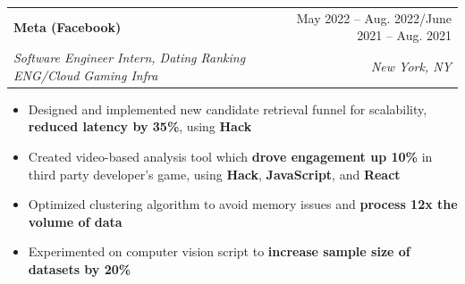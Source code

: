 \documentclass[letterpaper,11pt]{article}
\makeatletter
\newcommand{\resumeItem}[1]{
  \item\small{
    {#1 \vspace{-2pt}}
  }
}
\newcommand{\resumeSubheading}[4]{
  \vspace{-2pt}\item
    \begin{tabular*}{0.97\textwidth}[t]{l@{\extracolsep{\fill}}r}
      \textbf{#1} & #2 \\
      \textit{\small#3} & \textit{\small #4} \\
    \end{tabular*}\vspace{-7pt}
}
\newcommand{\resumeItemListStart}{\begin{itemize}[itemsep=0pt]}
\newcommand{\resumeItemListEnd}{\end{itemize}\vspace{-5pt}}
\makeatother
\begin{document}
    \resumeSubheading
      {Meta (Facebook)}{May 2022 -- Aug. 2022/June 2021 -- Aug. 2021}
      {Software Engineer Intern, Dating Ranking ENG/Cloud Gaming Infra}{New York, NY}
      \resumeItemListStart
        \resumeItem{Designed and implemented new candidate retrieval funnel for scalability, \textbf{reduced latency by 35\%}, using \textbf{Hack}}
        \resumeItem{Created video-based analysis tool which \textbf{drove engagement up 10\%} in third party developer's game, using \textbf{Hack}, \textbf{JavaScript}, and \textbf{React}}
        \resumeItem{Optimized clustering algorithm to avoid memory issues and \textbf{process 12x the volume of data}}
        \resumeItem{Experimented on computer vision script to \textbf{increase sample size of datasets by 20\%}}
    \resumeItemListEnd



\end{document}
